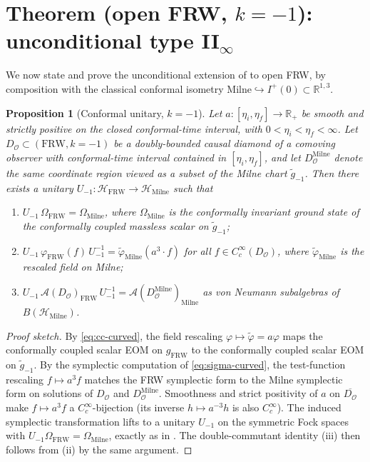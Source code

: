 \documentclass[11pt]{article}
\newtheorem{proposition}[theorem]{Proposition}
\theoremstyle{definition}
\newcommand{\R}{\mathbb{R}}
\newcommand{\HH}{\mathcal{H}}
\renewcommand{\AA}{\mathcal{A}}
\newcommand{\OO}{\mathcal{O}}
\newcommand{\FRW}{\mathrm{FRW}}
\newcommand{\Milne}{\mathrm{Milne}}
\begin{document}
\section{Theorem (open FRW, $k=-1$): unconditional type II$_\infty$}
\label{sec:open}

We now state and prove the unconditional extension of \cite[Thm.~3.5]{Remondiere2026}
to open FRW, by composition with the classical conformal isometry
$\Milne\hookrightarrow I^+(0)\subset\R^{1,3}$.

\begin{proposition}[Conformal unitary, $k=-1$]\label{prop:U-open}
Let $a:[\eta_i,\eta_f]\to\R_+$ be smooth and strictly positive on the
closed conformal-time interval, with $0<\eta_i<\eta_f<\infty$. Let
$D_\OO\subset(\FRW, k=-1)$ be a doubly-bounded causal diamond of a comoving
observer with conformal-time interval contained in $[\eta_i,\eta_f]$, and
let $D_\OO^\Milne$ denote the same coordinate region viewed as a subset of
the Milne chart $\tilde g_{-1}$. Then there exists a unitary
$U_{-1}:\HH_\FRW\to\HH_\Milne$ such that
\begin{enumerate}
\item[(i)] $U_{-1}\,\Omega_\FRW = \Omega_\Milne$, where $\Omega_\Milne$ is
the conformally invariant ground state of the conformally coupled massless
scalar on $\tilde g_{-1}$;
\item[(ii)] $U_{-1}\,\varphi_\FRW(f)\,U_{-1}^{-1}
= \tilde\varphi_\Milne(a^3\cdot f)$ for all $f\in C_c^\infty(D_\OO)$, where
$\tilde\varphi_\Milne$ is the rescaled field on Milne;
\item[(iii)] $U_{-1}\,\AA(D_\OO)_\FRW\,U_{-1}^{-1}
= \AA(D_\OO^\Milne)_\Milne$ as von Neumann subalgebras of $B(\HH_\Milne)$.
\end{enumerate}
\end{proposition}

\begin{proof}[Proof sketch]
By \eqref{eq:cc-curved}, the field rescaling $\varphi\mapsto\tilde\varphi=a\varphi$
maps the conformally coupled scalar EOM on $g_\FRW$ to the conformally
coupled scalar EOM on $\tilde g_{-1}$. By the symplectic computation of
\eqref{eq:sigma-curved}, the test-function rescaling
$f\mapsto a^3 f$ matches the FRW symplectic form to the Milne symplectic
form on solutions of $D_\OO$ and $D_\OO^\Milne$. Smoothness and strict
positivity of $a$ on $\overline{D_\OO}$ make $f\mapsto a^3 f$ a
$C_c^\infty$-bijection (its inverse $h\mapsto a^{-3} h$ is also
$C_c^\infty$). The induced symplectic transformation lifts to a unitary
$U_{-1}$ on the symmetric Fock spaces with $U_{-1}\Omega_\FRW=\Omega_\Milne$,
exactly as in \cite[Prop.~3.4]{Remondiere2026}. The double-commutant identity
(iii) then follows from (ii) by the same argument.
\end{proof}
\end{document}
